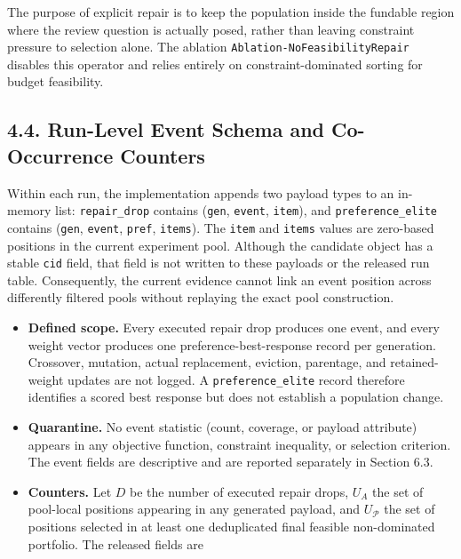 \documentclass[
  10pt,
  a4paper,
]{article}
\providecommand{\tightlist}{%
  \setlength{\itemsep}{0pt}\setlength{\parskip}{0pt}}
\begin{document}
The purpose of explicit repair is to keep the population inside the
fundable region where the review question is actually posed, rather than
leaving constraint pressure to selection alone. The ablation
\texttt{Ablation-NoFeasibilityRepair} disables this operator and relies
entirely on constraint-dominated sorting for budget feasibility.

\subsection{4.4. Run-Level Event Schema and Co-Occurrence
Counters}\label{run-level-event-schema-and-co-occurrence-counters}

Within each run, the implementation appends two payload types to an
in-memory list: \texttt{repair\_drop} contains (\texttt{gen},
\texttt{event}, \texttt{item}), and \texttt{preference\_elite} contains
(\texttt{gen}, \texttt{event}, \texttt{pref}, \texttt{items}). The
\texttt{item} and \texttt{items} values are zero-based positions in the
current experiment pool. Although the candidate object has a stable
\texttt{cid} field, that field is not written to these payloads or the
released run table. Consequently, the current evidence cannot link an
event position across differently filtered pools without replaying the
exact pool construction.

\begin{itemize}
\tightlist
\item
  \textbf{Defined scope.} Every executed repair drop produces one event,
  and every weight vector produces one preference-best-response record
  per generation. Crossover, mutation, actual replacement, eviction,
  parentage, and retained-weight updates are not logged. A
  \texttt{preference\_elite} record therefore identifies a scored best
  response but does not establish a population change.
\item
  \textbf{Quarantine.} No event statistic (count, coverage, or payload
  attribute) appears in any objective function, constraint inequality,
  or selection criterion. The event fields are descriptive and are
  reported separately in Section 6.3.
\item
  \textbf{Counters.} Let \(D\) be the number of executed repair drops,
  \(U_A\) the set of pool-local positions appearing in any generated
  payload, and \(U_{\mathcal P}\) the set of positions selected in at
  least one deduplicated final feasible non-dominated portfolio. The
  released fields are
\end{itemize}
\end{document}
